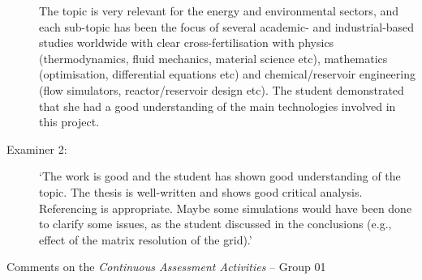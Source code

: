 \documentclass[14pt,twoside]{report}
\begin{document}
\begin{description}
The topic is very relevant for the energy and environmental sectors, and each sub-topic has been the focus of several academic- and industrial-based studies worldwide with clear cross-fertilisation with physics (thermodynamics, fluid mechanics, material science etc), mathematics (optimisation, differential equations etc) and chemical/reservoir engineering (flow simulators, reactor/reservoir design etc). The student demonstrated that she had a good understanding of the main technologies involved in this project.

\item[Examiner 2:] `The work is good and the student has shown good understanding of the topic. The thesis is well-written and shows good critical analysis. Referencing is appropriate. Maybe some simulations would have been done to clarify some issues, as the student discussed in the conclusions (e.g., effect of the matrix resolution of the grid).'

\end{description}


\clearpage






\vfill

\clearpage


\bigskip

\begin{center}
  {\Large Comments on the {\it Continuous Assessment Activities} -- Group 01}
\end{center}
\end{document}
